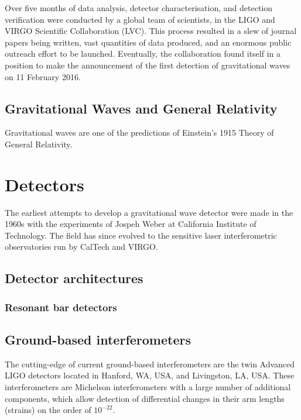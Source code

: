 \documentclass{kentigern}
\begin{document}
Over five months of data analysis, detector characterisation, and
detection verification were conducted by a global team of scientists,
in the LIGO and VIRGO Scientific Collaboration (LVC). This process
resulted in a slew of journal papers being written, vast quantities of
data produced, and an enormous public outreach effort to be
launched. Eventually, the collaboration found itself in a position to
make the announcement of the first detection of gravitational waves on
11 February 2016.


\section{Gravitational Waves and General Relativity}
\label{sec:grav-waves-gener}

Gravitational waves are one of the predictions of Einstein's 1915
Theory of General Relativity.

\chapter{Detectors}
\label{cha:detectors}


The earliest attempts to develop a gravitational wave detector were
made in the 1960s with the experiments of Jospeh Weber at California
Institute of Technology. The field has since evolved to the sensitive
laser interferometric observatories run by CalTech and VIRGO.

\section{Detector architectures}
\label{sec:detect-arch}

\subsection{Resonant bar detectors}
\label{sec:reson-bar-detect}

\section{Ground-based interferometers}
\label{sec:ground-based-interf}

The cutting-edge of current ground-based interferometers are the twin
Advanced LIGO detectors \cite{2015CQGra..32g4001L} located in Hanford,
WA, USA, and Livingston, LA, USA. These interferometers are Michelson
interferometers with a large number of additional components, which
allow detection of differential changes in their arm lengths (strains)
on the order of $10^{-22}$.
\end{document}
